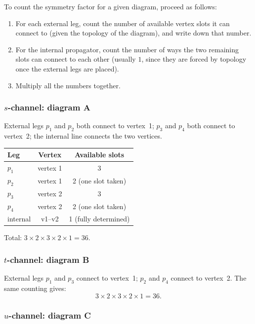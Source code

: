 \documentclass[../main.tex]{subfiles}
\begin{document}
To count the symmetry factor for a given diagram, proceed as follows:
\begin{enumerate}
  \item For each external leg, count the number of available vertex slots it can connect to (given the topology of the diagram), and write down that number.
  \item For the internal propagator, count the number of ways the two remaining slots can connect to each other (usually $1$, since they are forced by topology once the external legs are placed).
  \item Multiply all the numbers together.
\end{enumerate}

\subsubsection*{$s$-channel: diagram A}

External legs $p_1$ and $p_2$ both connect to vertex~1; $p_3$ and $p_4$ both connect to vertex~2; the internal line connects the two vertices.

\begin{center}
\begin{tabular}{lcc}
  \toprule
  Leg & Vertex & Available slots\\
  \midrule
  $p_1$ & vertex 1 & 3\\
  $p_2$ & vertex 1 & 2 (one slot taken)\\
  $p_3$ & vertex 2 & 3\\
  $p_4$ & vertex 2 & 2 (one slot taken)\\
  internal & v1--v2 & 1 (fully determined)\\
  \bottomrule
\end{tabular}
\end{center}
Total: $3 \times 2 \times 3 \times 2 \times 1 = 36$.

\subsubsection*{$t$-channel: diagram B}

External legs $p_1$ and $p_3$ connect to vertex~1; $p_2$ and $p_4$ connect to vertex~2.  The same counting gives:
\[
  3\times 2\times 3\times 2\times 1 = 36.
\]

\subsubsection*{$u$-channel: diagram C}
\end{document}
